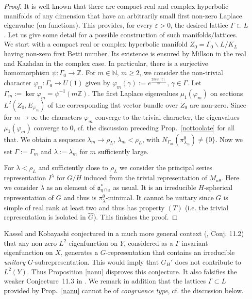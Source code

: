 \documentclass[10]{amsart}
\theoremstyle{remark}
\theoremstyle{definition}
\numberwithin{equation}{section}
\newcommand{\N}{\mathbb{N}}           %
\newcommand{\Z}{\mathbb{Z}}         %
\newcommand{\fa}{{\mathfrak a}}             %
\newcommand{\fq}{{\mathfrak q}}
\newcommand{\fs}{{\mathfrak s}}
\newcommand{\vp}{\varphi}
\newcommand{\ve}{\varepsilon}
\begin{document}
{\begin{proof}
It is well-known that there are compact real and complex hyperbolic manifolds of any dimension that have an arbitrarily small first non-zero Laplace eigenvalue (on functions).
This provides, for every $\ve>0$, the desired lattice $\Gamma\subset L$. Let us give some detail for a possible construction of such manifolds/lattices. We start with a compact real or complex hyperbolic manifold $Z_0=\Gamma_0\backslash L/K_L$ having non-zero first Betti number. Its existence is ensured by Millson \cite{Mill76} in the real and Kazhdan \cite{Kazh77} in the complex case.
In particular, there is a surjective homomorphism $\psi: \Gamma_0\rightarrow \Z$. For $m\in \N$, $m\ge 2$, we consider the non-trivial character $\vp_m:\Gamma_0\rightarrow U(1)$ given by $\vp_m(\gamma):=e^\frac{2\pi i \psi(\gamma)}{m}$, $\gamma\in \Gamma$. Let $\Gamma_m:=\ker \vp_m=\psi^{-1}(m\Z)$. The first Laplace eigenvalues $\mu_1(\vp_m)$ on sections $L^2(Z_0, E_{\vp_m})$ of the corresponding flat vector bundle over $Z_0$ are non-zero. Since for $m\to\infty$ the characters $\vp_m$ converge to the
trivial character,  the eigenvalues $\mu_1(\vp_m)$ converge to $0$, cf. the discussion preceding Prop.~\ref{nottoolate} for all that. We obtain a sequence $\lambda_m\to \rho_L$, $\lambda_m<\rho_L$, with $N_{\Gamma_m}(\pi_{\lambda_m}^0)\ne\{0\}$. Now we set $\Gamma:=\Gamma_m$ and $\lambda:=\lambda_m$ for $m$ sufficiently large.

For $\lambda<\rho_L$ and sufficiently close to $\rho_L$ we consider the principal series representation $I^\lambda$ for $G/H$ induced from the trivial representation of $M_{\sigma\theta}$. Here we consider $\lambda$ as an element of $\fa_{\fq\cap\fs}^*$ as usual. It is an irreducible $H$-spherical representation of $G$ and thus is $\pi_\lambda^0$-minimal.
It cannot be unitary since $G$ is simple of real rank at least two and thus has property $(T)$ (i.e. the trivial representation is isolated in $\widehat G$). This finishes the proof.
\end{proof}

Kassel and Kobayashi conjectured in a much more general context (\cite{KK25}, Conj. 11.2) that any non-zero $L^2$-eigenfunction on $Y$, considered as a $\Gamma$-invariant eigenfunction on $X$, generates a $G$-representation that contains an irreducible {\em unitary} $G$-subrepresentation. This would imply that $\widehat G_H'$ does not contribute to $L^2(Y)$. Thus Proposition \ref{nanu} disproves this conjecture. It also falsifies the weaker Conjecture~11.3 in \cite{KK25}. We remark in addition that the lattices $\Gamma\subset L$ provided by Prop.~\ref{nanu} cannot be of  {\em congruence type}, cf. the discussion below. 

}
\end{document}

